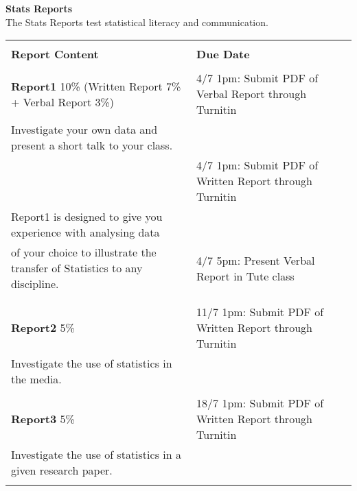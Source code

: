 \documentclass[bigtut]{quiz}\usepackage[]{graphicx}\usepackage[]{color}
\begin{document}
\begin{tutorial}
\newpage
{\bf Stats Reports} \\
The Stats Reports test statistical literacy and communication.   \\


{\small \begin{tabular}{|l|l|} \hline  
& \\ 
 {\bf Report Content} \hspace{1cm} & {\bf Due Date}  \\  [2ex]  \hline 
 & \\ 
{\bf Report1}  10\%   \hspace{.1cm} (Written Report 7\% + Verbal Report 3\%) & 4/7 1pm: Submit PDF of Verbal Report through Turnitin   \\
Investigate your own data and present a short talk to your class. &    \\
& 4/7  1pm: Submit PDF of Written Report through Turnitin    \\
Report1 is designed to give you experience with analysing data   &      \\ 
of your choice to illustrate the transfer of Statistics to any discipline. & 4/7 5pm: Present Verbal Report in Tute class   \\
&      \\  [2ex]  \hline 
 & \\  
 {\bf Report2} 5\% & 11/7 1pm: Submit PDF of Written Report through Turnitin \\  
 Investigate the use of statistics in the media.  &    \\ [2ex]   \hline 
 & \\  
 {\bf Report3} 5\% & 18/7 1pm: Submit PDF of Written Report through Turnitin \\ 
Investigate the use of statistics in a given research paper.  &    \\
  & \\   [2ex]   \hline 
\end{tabular} }


\end{tutorial}
\end{document}
